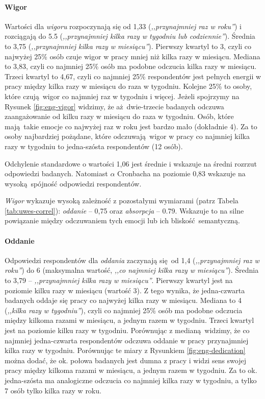 \paragraph{Wigor} Wartości dla \textit{wigoru} rozpoczynają się od 1,33 (\textit{,,przynajmniej raz w roku''}) i rozciągają do 5.5 (\textit{,,przynajmniej kilka razy w tygodniu lub codziennie''}). Średnia to 3,75 (\textit{,,przynajmniej kilka razy w miesiącu''}). Pierwszy kwartyl to 3, czyli co najwyżej 25\% osób czuje wigor w pracy mniej niż kilka razy w miesiącu. Mediana to 3,83, czyli co najmniej 25\% osób ma podobne odczucia kilka razy w miesiącu. Trzeci kwartyl to 4,67, czyli co najmniej 25\%
respondentów jest pełnych energii w pracy między kilka razy w miesiącu do raza w tygodniu. Kolejne 25\% to osoby, które czują wigor co najmniej raz w tygodniu i więcej. Jeżeli spojrzymy na Rysunek \ref{fig:eng-vigor} widzimy, że aż dwie-trzecie badanych odczuwa zaangażowanie od kilku razy w miesiącu do raza w tygodniu. Osób, które mają takie emocje co najwyżej raz w roku jest bardzo mało (dokładnie 4). Za to osoby najbardziej pożądane, które odczuwają wigor w pracy co najmniej
kilka razy w tygodniu to jedna-szósta respondentów (12 osób).

Odchylenie standardowe o wartości 1,06 jest średnie i wskazuje na średni rozrzut odpowiedzi badanych. Natomiast $\alpha$ Cronbacha na poziomie 0,83 wskazuje na wysoką spójność odpowiedzi respondentów.

\textit{Wigor} wykazuje wysoką zależność z pozostałymi wymiarami (patrz Tabela \ref{tab:uwes-correl}): \textit{oddanie} -- 0,75 oraz \textit{absorpcja} -- 0.79. Wskazuje to na silne powiązanie między odczuwaniem tych emocji lub ich bliskość semantyczną.

\paragraph{Oddanie} Odpowiedzi respondentów dla \textit{oddania} zaczynają się od 1,4 (\textit{,,przynajmniej raz w roku''}) do 6 (maksymalna wartość, \textit{,,co najmniej kilka razy w miesiącu''}). Średnia to 3,79 -- \textit{,,przynajmniej kilka razy w miesiącu''}. Pierwszy kwartyl jest na poziomie kilku razy w miesiącu (wartość 3). Z tego wynika, że jedna-czwarta badanych oddaje się pracy co najwyżej kilka razy w miesiącu. Mediana to 4 (\textit{,,kilka razy w tygodniu''}), czyli co najmniej 25\% osób ma podobne odczucia
między kilkoma razami w miesiącu, a jednym razem w tygodniu. Trzeci kwartyl jest na poziomie kilku razy w tygodniu. Porównując z medianą widzimy, że co najmniej jedna-czwarta respondentów odczuwa oddanie w pracy przynajmniej kilka razy w tygodniu. Porównując te miary z Rysunkiem \ref{fig:eng-dedication} można dodać, że ok. połowa badanych jest dumna z pracy i widzi sens swojej pracy między kilkoma razami w miesiącu, a jednym razem w tygodniu. Za to ok.
jedna-szósta ma analogiczne odczucia co najmniej kilka razy w tygodniu, a tylko 7 osób tylko kilka razy w roku.

